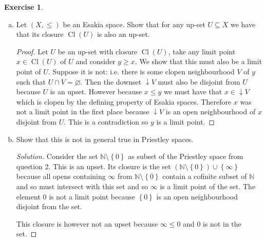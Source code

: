 \documentclass{article}
\newcommand{\N}{\mathbb{N}}
\newcommand{\set}[1]{\left\{#1\right\}}
\renewcommand{\qedsymbol}{\raisebox{-0.5cm}{}}
\DeclareMathOperator{\closed}{Cl}
\newenvironment{solution}{\begin{proof}[Solution]\renewcommand\qedsymbol{}}{\end{proof}}
\theoremstyle{definition}
\newtheorem{question}{Exercise}
\begin{document}
\begin{question}\,
    \begin{enumerate}[(a)]
        \item Let \((X,\leq)\) be an Esakia space. Show that for any up-set
              \(U\subseteq X\) we have that its closure \(\closed(U)\) is also
              an up-set.

              \begin{proof}
                  Let \(U\) be an up-set with closure \(\closed(U)\), take any
                  limit point \(x\in\closed(U)\) of \(U\) and consider \(y\geq
                  x\). We show that this must also be a limit point of \(U\).
                  Suppose it is not: i.e. there is some clopen neighbourhood
                  \(V\) of \(y\) such that \(U\cap V=\varnothing\). Then the
                  downset \(\downarrow V\) must also be disjoint from \(U\)
                  because \(U\) is an upset. However because \(x\leq y\) we must
                  have that \(x\in \downarrow V\) which is clopen by the
                  defining property of Esakia spaces. Therefore \(x\) was not a
                  limit point in the first place because \(\downarrow V\) is an
                  open neighbourhood of \(x\) disjoint from \(U\). This is a
                  contradiction so \(y\) is a limit point.
              \end{proof}

        \item Show that this is not in general true in Priestley spaces.

              \begin{solution}
                  Consider the set \(\N\setminus\set{0}\) as subset of the
                  Priestley space from question 2. This is an upset. Its closure
                  is the set \((\N\setminus\set{0})\cup\set{\infty}\) because
                  all opens containing \(\infty\) from \(\N\setminus\set{0}\)
                  contain a cofinite subset of \(\N\) and so must intersect with
                  this set and so \(\infty\) is a limit point of the set. The
                  element \(0\) is not a limit point because \(\set{0}\) is an
                  open neighbourhood disjoint from the set.

                  This closure is however not an upset because \(\infty\leq 0\)
                  and \(0\) is not in the set.
              \end{solution}
    \end{enumerate}
\end{question}
\end{document}
